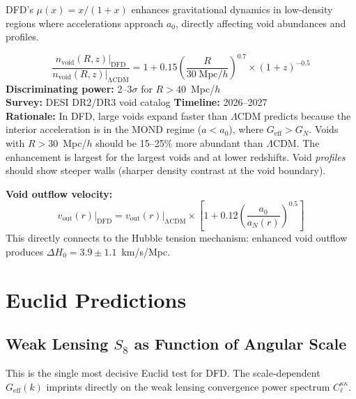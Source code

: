 \documentclass[12pt]{article}
\newcommand{\LCDM}{$\Lambda$CDM}
\begin{document}
DFD's $\mu(x)=x/(1+x)$ enhances gravitational dynamics in low-density regions where accelerations approach $a_0$, directly affecting void abundances and profiles.

\begin{predbox}
\begin{equation}
\boxed{
\frac{n_\mathrm{void}(R,z)\big|_\mathrm{DFD}}{n_\mathrm{void}(R,z)\big|_\mathrm{\Lambda CDM}} = 1 + 0.15\left(\frac{R}{30\;\mathrm{Mpc}/h}\right)^{0.7} \times (1+z)^{-0.5}
}
\end{equation}
\textbf{Discriminating power:} 2--3$\sigma$ for $R > 40$~Mpc/$h$\\
\textbf{Survey:} DESI DR2/DR3 void catalog \quad\textbf{Timeline:} 2026--2027\\
\textbf{Rationale:} In DFD, large voids expand faster than \LCDM{} predicts because the interior acceleration is in the MOND regime ($a < a_0$), where $G_\mathrm{eff} > G_N$. Voids with $R > 30$~Mpc/$h$ should be 15--25\% more abundant than \LCDM. The enhancement is largest for the largest voids and at lower redshifts. Void \emph{profiles} should show steeper walls (sharper density contrast at the void boundary).

\medskip\noindent
\textbf{Void outflow velocity:}
\begin{equation}
v_\mathrm{out}(r) \bigg|_\mathrm{DFD} = v_\mathrm{out}(r)\bigg|_\mathrm{\Lambda CDM} \times \left[1 + 0.12\left(\frac{a_0}{a_N(r)}\right)^{0.5}\right]
\end{equation}
This directly connects to the Hubble tension mechanism: enhanced void outflow produces $\Delta H_0 = 3.9\pm1.1$~km/s/Mpc.
\end{predbox}

\section{Euclid Predictions}
\label{sec:euclid}

\subsection{Weak Lensing $S_8$ as Function of Angular Scale}

This is the single most decisive Euclid test for DFD. The scale-dependent $G_\mathrm{eff}(k)$ imprints directly on the weak lensing convergence power spectrum $C_\ell^{\kappa\kappa}$.
\end{document}

